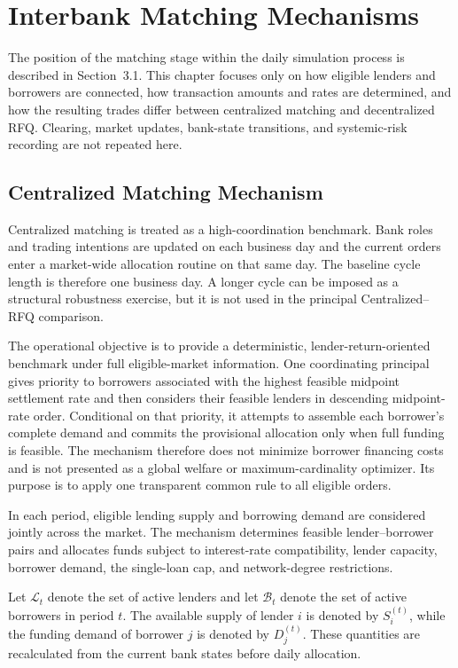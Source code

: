 \chapter{Interbank Matching Mechanisms}

The position of the matching stage within the daily simulation process
is described in Section~3.1. This chapter focuses only on how eligible
lenders and borrowers are connected, how transaction amounts and rates
are determined, and how the resulting trades differ between centralized
matching and decentralized RFQ. Clearing, market updates, bank-state
transitions, and systemic-risk recording are not repeated here.

\section{Centralized Matching Mechanism}

Centralized matching is treated as a high-coordination benchmark. Bank
roles and trading intentions are updated on each business day and the
current orders enter a market-wide allocation routine on that same day.
The baseline cycle length is therefore one business day. A longer cycle
can be imposed as a structural robustness exercise, but it is not used in
the principal Centralized--RFQ comparison.

The operational objective is to provide a deterministic,
lender-return-oriented benchmark under full eligible-market information.
One coordinating principal gives priority to borrowers associated with
the highest feasible midpoint settlement rate and then considers their
feasible lenders in descending midpoint-rate order. Conditional on that
priority, it attempts to assemble each borrower's complete demand and
commits the provisional allocation only when full funding is feasible.
The mechanism therefore does not minimize borrower financing costs and is
not presented as a global welfare or maximum-cardinality optimizer. Its
purpose is to apply one transparent common rule to all eligible orders.

In each period, eligible lending supply and borrowing demand are
considered jointly across the market. The mechanism determines feasible
lender--borrower pairs and allocates funds subject to interest-rate
compatibility, lender capacity, borrower demand, the single-loan cap,
and network-degree restrictions.

Let \(\mathcal{L}_{t}\) denote the set of active lenders and let
\(\mathcal{B}_{t}\) denote the set of active borrowers in period \(t\).
The available supply of lender \(i\) is denoted
by \(S_{i}^{(t)}\), while the funding demand of borrower \(j\) is denoted
by \(D_{j}^{(t)}\). These quantities are recalculated from the current
bank states before daily allocation.

